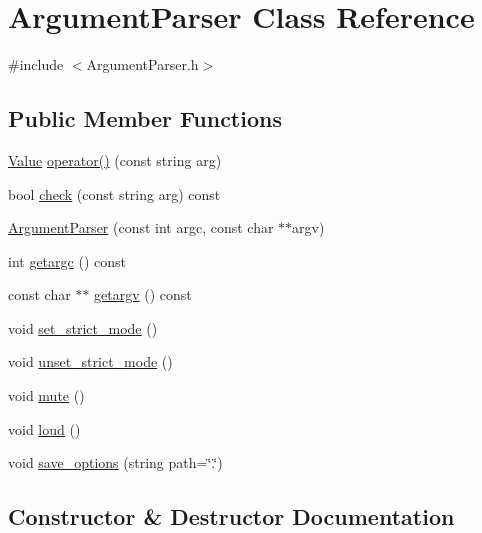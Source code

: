 \hypertarget{class_argument_parser}{}\section{Argument\+Parser Class Reference}
\label{class_argument_parser}


{\ttfamily \#include $<$Argument\+Parser.\+h$>$}

\subsection*{Public Member Functions}
\begin{DoxyCompactItemize}
\item 
\hyperlink{class_value}{Value} \hyperlink{class_argument_parser_acca583e2f4ed0d0eea39df89e03977ee}{operator()} (const string arg)
\item 
bool \hyperlink{class_argument_parser_adf986abe5c47699a651ee939e198407d}{check} (const string arg) const 
\item 
\hyperlink{class_argument_parser_a1355ae6f318c765d406d4ea600d2ea62}{Argument\+Parser} (const int argc, const char $\ast$$\ast$argv)
\item 
int \hyperlink{class_argument_parser_a778f72cb66634cea1a93446c4a0bc428}{getargc} () const 
\item 
const char $\ast$$\ast$ \hyperlink{class_argument_parser_aa20c2b84e7f77cfd65e315b8291fe342}{getargv} () const 
\item 
void \hyperlink{class_argument_parser_af30fc2364f2e0cf72e9ce17bf30fd645}{set\+\_\+strict\+\_\+mode} ()
\item 
void \hyperlink{class_argument_parser_a47b9bd39a2587221398c6785560072f8}{unset\+\_\+strict\+\_\+mode} ()
\item 
void \hyperlink{class_argument_parser_a6aaf4cd8c288d4de96aefdd5299a4f59}{mute} ()
\item 
void \hyperlink{class_argument_parser_acafcfe7dfe91ced9a020a65979bf03d9}{loud} ()
\item 
void \hyperlink{class_argument_parser_a10793f42b5c6bbb358d2929b2dc09c0f}{save\+\_\+options} (string path=\char`\"{}.\char`\"{})
\end{DoxyCompactItemize}


\subsection{Constructor \& Destructor Documentation}
\hypertarget{class_argument_parser_a1355ae6f318c765d406d4ea600d2ea62}{}
